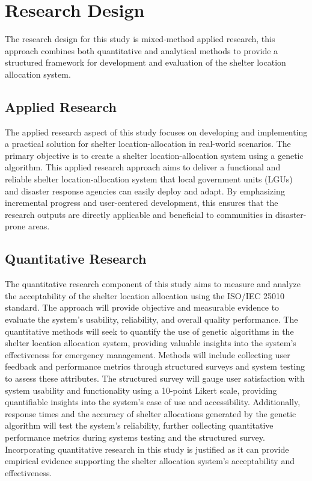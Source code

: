 \section{Research Design}

The research design for this study is mixed-method applied research, this approach combines both quantitative and analytical methods to provide a structured framework for development and evaluation of the shelter location allocation system.

\subsection{Applied Research}

The applied research aspect of this study focuses on developing and implementing a practical solution for shelter location-allocation in real-world scenarios. The primary objective is to create a shelter location-allocation system using a genetic algorithm.
This applied research approach aims to deliver a functional and reliable shelter location-allocation system that local government units (LGUs) and disaster response agencies can easily deploy and adapt. By emphasizing incremental progress and user-centered development, this ensures that the research outputs are directly applicable and beneficial to communities in disaster-prone areas.

\subsection{Quantitative Research}

The quantitative research component of this study aims to measure and analyze the acceptability of the shelter location allocation using the ISO/IEC 25010 standard. The approach will provide objective and measurable evidence to evaluate the system's usability, reliability, and overall quality performance. The quantitative methods will seek to quantify the use of genetic algorithms in the shelter location allocation system, providing valuable insights into the system's effectiveness for emergency management.
Methods will include collecting user feedback and performance metrics through structured surveys and system testing to assess these attributes. The structured survey will gauge user satisfaction with system usability and functionality using a 10-point Likert scale, providing quantifiable insights into the system's ease of use and accessibility. Additionally, response times and the accuracy of shelter allocations generated by the genetic algorithm will test the system's reliability, further collecting quantitative performance metrics during systems testing and the structured survey.
Incorporating quantitative research in this study is justified as it can provide empirical evidence supporting the shelter allocation system's acceptability and effectiveness.

